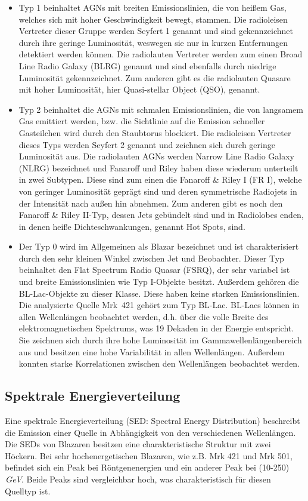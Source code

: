 \begin{itemize}
 \item Typ 1 beinhaltet AGNs mit breiten Emissionslinien, die von heißem Gas, welches sich mit hoher Geschwindigkeit bewegt, stammen.
 Die radioleisen Vertreter dieser Gruppe werden Seyfert 1 genannt und sind gekennzeichnet durch ihre geringe Luminosität, weswegen sie nur in kurzen Entfernungen detektiert werden können.
 Die radiolauten Vertreter werden zum einen Broad Line Radio Galaxy (BLRG) genannt und sind ebenfalls durch niedrige Luminosität gekennzeichnet. 
 Zum anderen gibt es die radiolauten Quasare mit hoher Luminosität, hier Quasi-stellar Object (QSO), genannt.
 \item Typ 2 beinhaltet die AGNs mit schmalen Emissionslinien, die von langsamem Gas emittiert werden, bzw. die Sichtlinie auf die Emission schneller Gasteilchen wird durch den Staubtorus blockiert.
 Die radioleisen Vertreter dieses Typs werden Seyfert 2 genannt und zeichnen sich durch geringe Luminosität aus.
 Die radiolauten AGNs werden Narrow Line Radio Galaxy (NLRG) bezeichnet und Fanaroff und Riley haben diese wiederum unterteilt in zwei Subtypen.
 Diese sind zum einen die Fanaroff \& Riley I (FR I), welche von geringer Luminosität geprägt sind und deren symmetrische Radiojets in der Intensität nach außen hin abnehmen.
 Zum anderen gibt es noch den Fanaroff \& Riley II-Typ, dessen Jets gebündelt sind und in Radiolobes enden, in denen heiße Dichteschwankungen, genannt Hot Spots, sind.
 \item Der Typ 0 wird im Allgemeinen als Blazar bezeichnet und ist charakterisiert durch den sehr kleinen Winkel zwischen Jet und Beobachter.
 Dieser Typ beinhaltet den Flat Spectrum Radio Quasar (FSRQ), der sehr variabel ist und breite Emissionslinien wie Typ I-Objekte besitzt.
 Außerdem gehören die BL-Lac-Objekte zu dieser Klasse. Diese haben keine starken Emissionslinien.
 Die analysierte Quelle Mrk~421 gehört zum Typ BL-Lac.
 BL-Lacs können in allen Wellenlängen beobachtet werden, d.h. über die volle Breite des elektromagnetischen Spektrums, was 19 Dekaden in der Energie entspricht.
 Sie zeichnen sich durch ihre hohe Luminosität im Gammawellenlängenbereich aus und besitzen eine hohe Variabilität in allen Wellenlängen.
 Außerdem konnten starke Korrelationen zwischen den Wellenlängen beobachtet werden.
\end{itemize}


\subsection{Spektrale Energieverteilung}
Eine spektrale Energieverteilung (SED: Spectral Energy Distribution) beschreibt die Emission einer Quelle in Abhängigkeit von den verschiedenen Wellenlängen.
Die SEDs von Blazaren besitzen eine charakteristische Struktur mit zwei Höckern.
Bei sehr hochenergetischen Blazaren, wie z.B. Mrk 421 und Mrk 501, befindet sich ein Peak bei Röntgenenergien und ein anderer Peak bei (10-250)$\,\si{GeV}$.
Beide Peaks sind vergleichbar hoch, was charakteristisch für diesen Quelltyp ist.\cite{Weekes}


